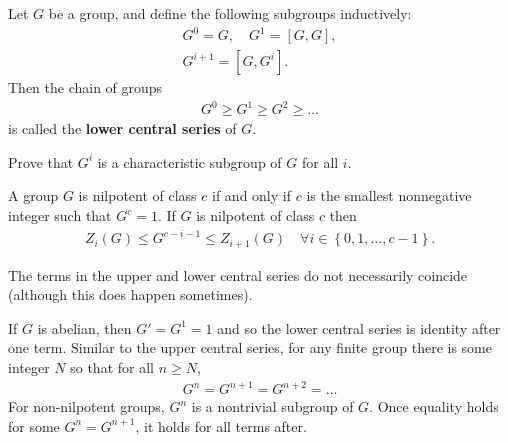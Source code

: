 \documentclass{memoir}
\begin{document}
\begin{defn}
	Let \(G\) be a group, and define the following subgroups inductively:
	\begin{align*}
		G^{0} = G, \quad G^{1}= [G,G],\\
		G^{i+1}= [G,G^{i}].
	\end{align*}
	Then the chain of groups
	\begin{align*}
		G^{0}\geq G^{1}\geq G^2\geq \ldots
	\end{align*}
	is called the \textbf{lower central series} of \(G\).
\end{defn}
\begin{hw}
	Prove that \(G^{i}\) is a characteristic subgroup of \(G\) for all \(i\).
\end{hw}

\begin{thm}
	A group \(G\) is nilpotent of class \(c\) if and only if \(c\) is the smallest nonnegative integer such that \(G^{c}=1\). If \(G\) is nilpotent of class \(c\) then
	\begin{align*}
		Z_i(G) \leq G^{c-i-1}\leq Z_{i+1}(G) \quad \forall i \in \left\{ 0,1,\ldots,c-1 \right\} .
	\end{align*}
\end{thm}
The terms in the upper and lower central series do not necessarily coincide (although this does happen sometimes).

\begin{rmrk}
	If \(G\) is abelian, then \(G' = G^{1} = 1\) and so the lower central series is identity after one term. Similar to the upper central series, for any finite group there is some integer \(N\) so that for all \(n\geq N\),
	\begin{align*}
		G^{n}= G^{n+1} = G^{n+2} = \ldots
	\end{align*}
	For non-nilpotent groups, \(G^{n}\) is a nontrivial subgroup of \(G\). Once equality holds for some \(G^{n}= G^{n+1}\), it holds for all terms after.
\end{rmrk}
\end{document}
